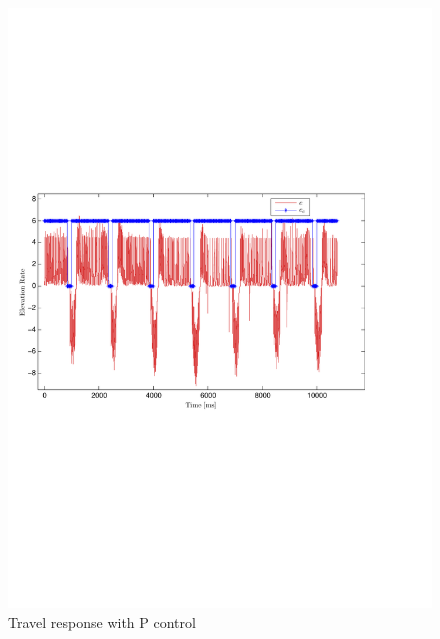 \begin{figure}[!!ht!!!!!!!!tb!!]
	\centering
		\includegraphics[width=1\textwidth,trim={4cm 9cm 4cm 9cm},clip]{figures/P3p2_e_dot.pdf}
	\caption{Travel response with P control}
\label{fig:P3p2_e_dot}
\end{figure}
\clearpage
